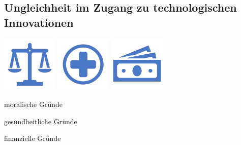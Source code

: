 \documentclass[aspectratio=169,16pt,xcolor=table]{beamer}
\begin{document}
\subsection{Ungleichheit im Zugang zu technologischen Innovationen}
\begin{frame} %
    \centering
    
    \includegraphics[width=0.2\textwidth]{./pictures/Fair.png}
    \hspace{1.0cm}
    \includegraphics[width=0.2\textwidth]{./pictures/+.png}
    \hspace{1.0cm}
    \includegraphics[width=0.2\textwidth]{./pictures/money.png}
    
    \vspace{0.2cm}
    
    \begin{minipage}[t]{0.2\textwidth}
      \centering
      \small moralische Gründe
    \end{minipage}
     \hspace{1.0cm}
    \begin{minipage}[t]{0.2\textwidth}
    \centering
    \small gesundheitliche Gründe
    \end{minipage}
    \hspace{1,0cm}
    \begin{minipage}[t]{0.2\textwidth}
    \centering
    \small finanzielle Gründe
    \end{minipage}
\end{frame}


\end{document}
